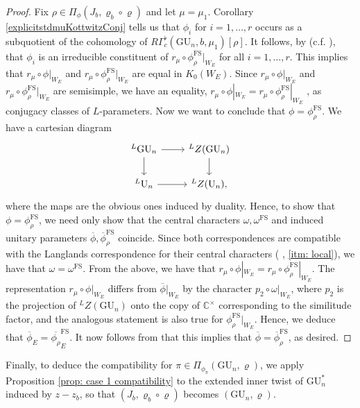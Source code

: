 \documentclass[reqno,11pt]{amsart}
\theoremstyle{remark}
\newcommand{\GU}{\mathrm{GU}}
\newcommand{\U}{\mathrm{U}}
\newcommand{\C}{\mathbb{C}}
\newcommand{\LL}{{}^L}
\newcommand{\ov}{\overline}
\begin{document}
\begin{proof}
Fix $\rho \in \Pi_{\phi}(J_{b}, \varrho_{b} \circ \varrho)$ and let $\mu = \mu_{1}$. Corollary \ref{explicitstdmuKottwitzConj} tells us that $\phi_{i}$ for $i = 1,\ldots,r$ occurs as a subquotient of the cohomology of $R\Gamma^{\flat}_{c}(\GU_n,b,\mu_{1})[\rho]$. It follows, by \cite[Theorem~1.3]{Ko} (c.f. \cite[Lemma~3.10]{Ham}), that $\phi_{i}$ is an irreducible constituent of $r_{\mu} \circ {\phi_{\rho}^{\mathrm{FS}}}|_{W_E}$ for all $i = 1,\ldots,r$. This implies that $r_{\mu} \circ \phi|_{W_E}$ and $r_{\mu} \circ {\phi_{\rho}^{\mathrm{FS}}}|_{W_E}$ are equal in $K_{0}(W_{E})$. Since $r_{\mu} \circ \phi|_{W_E}$ and $r_{\mu} \circ \phi^{\mathrm{FS}}_{\rho}|_{W_E}$ are semisimple, we have an equality, $r_{\mu} \circ \phi|_{W_E} = r_{\mu} \circ {\phi_{\rho}^{\mathrm{FS}}}|_{W_E}$ ,
as conjugacy classes of $L$-parameters. Now we want to conclude that $\phi = \phi_{\rho}^{\mathrm{FS}}$. We have a cartesian diagram
\begin{equation*}
\begin{tikzcd}
\LL \GU_n \arrow[r] \arrow[d] &  \LL Z(\GU_n) \arrow[d]\\
 \LL \U_n \arrow[r] &  \LL Z(\U_n),
\end{tikzcd}    
\end{equation*}
where the maps are the obvious ones induced by duality. Hence, to show that $\phi = \phi^{\mathrm{FS}}_{\rho}$, we need only show that the central characters $\omega, \omega^{\mathrm{FS}}$ and induced unitary parameters $\ov{\phi}, \ov{\phi}^{\mathrm{FS}}_{\rho}$ coincide. Since both correspondences are compatible with the Langlands correspondence for their central characters ( \cite[Theorem~I.9.6 (iii)]{FS}, \ref{itm: local}), we have that $\omega = \omega^{\mathrm{FS}}$. From the above, we have that $r_{\mu} \circ \phi|_{W_E} = r_{\mu} \circ {\phi_{\rho}^{\mathrm{FS}}}|_{W_E}$. The representation $r_{\mu} \circ \phi|_{W_E}$ differs from $\ov{\phi}|_{W_E}$ by the character $p_2 \circ \omega|_{W_E}$, where $p_2$ is the projection of $\LL Z(\GU_n)$ onto the copy of $\C^{\times}$ corresponding to the similitude factor, and the analogous statement is also true for ${\phi_{\rho}^{\mathrm{FS}}}|_{W_E}$. Hence, we deduce that  $\overline{\phi}_{E} = \overline{\phi_{\rho}}_{E}^{\mathrm{FS}}.$
It now follows from \cite[Theorem~8.1 (ii)]{GGP} that this implies that $\overline{\phi} = \overline{\phi}_{\rho}^{\mathrm{FS}}$, as desired. 
\end{proof}

Finally, to deduce the compatibility for $\pi \in \Pi_{\phi_{\pi}}(\GU_n, \varrho)$, we apply Proposition \ref{prop: case 1 compatibility} to the extended inner twist of $\GU^*_n$ induced by $z-z_b$, so that $(J_b, \varrho_b\circ \varrho)$ becomes $(\GU_n, \varrho)$.
\end{document}
